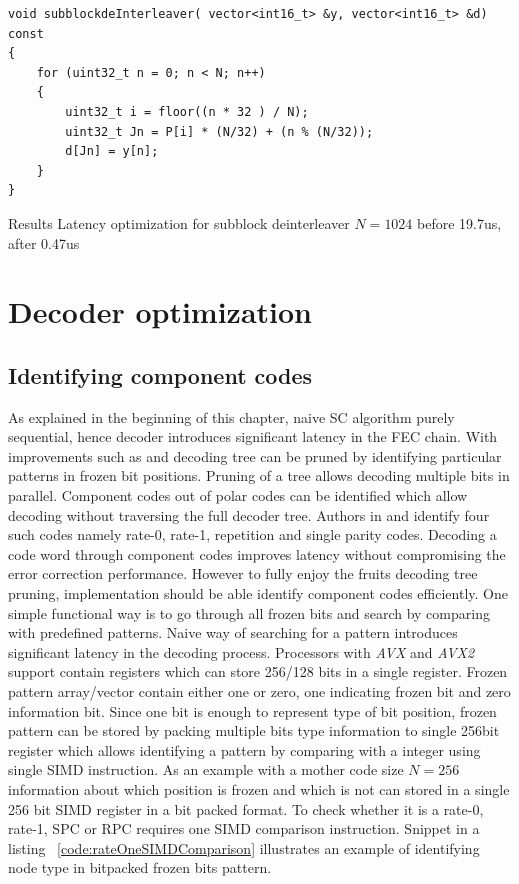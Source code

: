 \begin{code}
\label{code:slowSubblockDeinterleaver}
\begin{verbatim}
void subblockdeInterleaver( vector<int16_t> &y, vector<int16_t> &d) const
{
	for (uint32_t n = 0; n < N; n++)
	{
		uint32_t i = floor((n * 32 ) / N);
		uint32_t Jn = P[i] * (N/32) + (n % (N/32));
		d[Jn] = y[n];
	}
}
\end{verbatim}
\end{code}

Results Latency optimization for subblock deinterleaver $N = 1024$
before 19.7us, after 0.47us 

\section{Decoder optimization}

\subsection{Identifying component codes}
As explained in the beginning of this chapter, naive SC algorithm purely sequential, hence decoder introduces significant latency in the FEC chain. With improvements such as \cite{fastSSC} and \cite{SSC} decoding tree can be pruned by identifying particular patterns in frozen bit positions. Pruning of a tree allows decoding multiple bits in parallel. Component codes out of polar codes can be identified which allow decoding without traversing the full decoder tree. Authors in \cite{SSC} and \cite{fastSSC} identify four such codes namely rate-0, rate-1, repetition and single parity codes. Decoding a code word through component codes improves latency without compromising the error correction performance. However to fully enjoy the fruits decoding tree pruning, implementation should be able identify component codes efficiently. One simple functional way is to go through all frozen bits and search by comparing with predefined patterns. Naive way of searching for a pattern introduces significant latency in the decoding process. Processors with \textit{AVX} and \textit{AVX2} support contain registers which can store 256/128 bits in a single register. Frozen pattern array/vector contain either one or zero, one indicating frozen bit and zero information bit. Since one bit is enough to represent type of bit position, frozen pattern can be stored by packing multiple bits type information to single 256bit register which allows identifying a pattern by comparing with a integer using single SIMD instruction. As an example with a mother code size $N=256$ information about which position is frozen and which is not can stored in a single 256 bit SIMD register in a bit packed format. To check whether it is a rate-0, rate-1, SPC or RPC requires one SIMD comparison instruction. Snippet in a listing ~\ref{code:rateOneSIMDComparison} illustrates an example of identifying node type in bitpacked frozen bits pattern.

